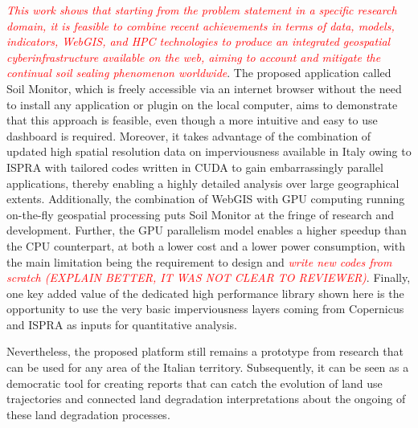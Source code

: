 \documentclass[APA,LATO1COL,doublespace]{WileyNJD-v2}
\newcommand{\toberevised}[1]{\emph{\textcolor{red}{#1}}} %
\begin{document}
\toberevised{This work shows that starting from the problem statement in a specific research domain, it is feasible to combine recent achievements in terms of data, models, indicators, WebGIS, and HPC technologies to produce an integrated geospatial cyberinfrastructure available on the web, aiming to account and mitigate the continual soil sealing phenomenon worldwide}. 
The proposed application called Soil Monitor, which is freely accessible via an internet browser without the need to install any application or plugin on the local computer, aims to demonstrate that this approach is feasible, even though a more intuitive and easy to use dashboard is required.
Moreover, it takes advantage of the combination of updated high spatial resolution data on imperviousness available in Italy owing to ISPRA with tailored codes written in CUDA to gain embarrassingly parallel applications, thereby enabling a highly detailed analysis over large geographical extents.
Additionally, the combination of WebGIS with GPU computing running on-the-fly geospatial processing puts Soil Monitor at the fringe of research and development. 
Further, the GPU parallelism model enables a higher speedup than the CPU counterpart, at both a lower cost and a lower power consumption, with the main limitation being the requirement to design and \toberevised{write new codes from scratch (EXPLAIN BETTER, IT WAS NOT CLEAR TO REVIEWER)}. Finally, one key added value of the dedicated high performance library shown here is the opportunity to use the very basic imperviousness layers coming from Copernicus and ISPRA as inputs for quantitative analysis.

Nevertheless, the proposed platform still remains a prototype from research that can be used for any area of the Italian territory. 
Subsequently, it can be seen as a democratic tool for creating reports that can catch the evolution of land use trajectories and connected land degradation interpretations about the ongoing of these land degradation processes.
\end{document}
